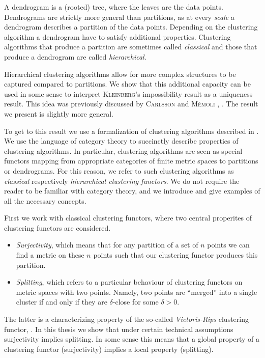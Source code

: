 A dendrogram is a (rooted) tree, where the leaves are the data points. Dendrograms are strictly more general than partitions, as at every \emph{scale} a dendrogram describes a partition of the data points.
Depending on the clustering algorithm a dendrogram have to satisfy additional properties.
Clustering algorithms that produce a partition are sometimes called \emph{classical} and those that produce a dendrogram are called \emph{hierarchical}.


Hierarchical clustering algorithms allow for more complex structures to be captured compared to partitions. We show that this additional capacity can be used in some sense to interpret \textsc{Kleinberg}'s impossibility result as a uniqueness result. This idea was previously discussed by \textsc{Carlsson} and \textsc{M\'emoli} \cite{JMLR:v11:carlsson10a}, \cite{Carlsson2010}. The result we present is slightly more general.

To get to this result we use a formalization of clustering algorithms described in \cite{Carlsson2010}. We use the language of category theory to succinctly describe properties of clustering algorithms. In particular, clustering algorithms are seen as special functors mapping from appropriate categories of finite metric spaces to partitions or dendrograms. For this reason, we refer to such clustering algorithms as \emph{classical} respectively \emph{hierarchical clustering functors}. We do not require the reader to be familiar with category theory, and we introduce and give examples of all the necessary concepts.

First we work with classical clustering functors, where two central properites of clustering functors are considered.
\begin{itemize}
    \item \emph{Surjectivity}, which means that for any partition of a set of $n$ points we can find a metric on these $n$ points such that our clustering functor produces this partition.
    \item \emph{Splitting}, which refers to a particular behaviour of clustering functors on metric spaces with two points. Namely, two points are ``merged'' into a single cluster if and only if they are $\delta$-close for some $\delta > 0$.
\end{itemize}

The latter is a characterizing property of the so-called \emph{Vietoris-Rips} clustering functor, \cite[Thm.~6.4]{Carlsson2010}.
In this thesis we show that under certain technical assumptions surjectivity implies splitting. In some sense this means that a global property of a clustering functor (surjectivity) implies a local property (splitting).

